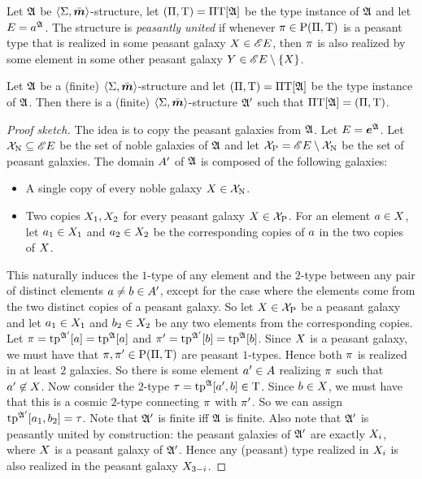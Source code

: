 \begin{definition}
Let $\mathfrak{A}$ be $\left\langle \mathrm{\Sigma},\bar{\bm{m}} \right\rangle$-structure, let $(\Pi,\mathrm{T}) =
\Pi\mathrm{T}[\mathfrak{A}]$ be the type instance of $\mathfrak{A}$ and let $E =
a^{\mathfrak{A}}$. The structure is \emph{peasantly united} if whenever $\pi \in
\mathrm{P}(\Pi,\mathrm{T})$ is a peasant type that is realized in some peasant galaxy
$X \in {\mathscr{E}E}$, then $\pi$ is also realized by some element in some
other peasant galaxy $Y \in {\mathscr{E}E} \setminus \left\{X\right\}$.
\end{definition}
\begin{lemma}
Let $\mathfrak{A}$ be a (finite) $\left\langle \mathrm{\Sigma},\bar{\bm{m}} \right\rangle$-structure and let $(\Pi,\mathrm{T}) =
\Pi\mathrm{T}[\mathfrak{A}]$ be the type instance of $\mathfrak{A}$.
Then there is a (finite) $\left\langle \mathrm{\Sigma},\bar{\bm{m}} \right\rangle$-structure $\mathfrak{A'}$ such that
$\Pi\mathrm{T}[\mathfrak{A}] = (\Pi,\mathrm{T})$.
\end{lemma}
\begin{proof}[Proof sketch]
The idea is to copy the peasant galaxies from $\mathfrak{A}$. Let $E =
\bm{e}^{\mathfrak{A}}$. Let $\mathcal{X}_{\mathrm{\mathrm{N}}} \subseteq {\mathscr{E}E}$ be the set of noble
galaxies of $\mathfrak{A}$ and let $\mathcal{X}_{\mathrm{P}} = {\mathscr{E}E} \setminus \mathcal{X}_{\mathrm{\mathrm{N}}}$
be the set of peasant galaxies. The domain $A'$ of $\mathfrak{A}$ is composed of
the following galaxies:
\begin{itemize}
  \item A single copy of every noble galaxy $X \in \mathcal{X}_{\mathrm{\mathrm{N}}}$.
  \item Two copies $X_1, X_2$ for every peasant galaxy $X \in
  \mathcal{X}_{\mathrm{P}}$. For an element $a \in X$, let $a_1 \in X_1$ and
  $a_2 \in X_2$ be the corresponding copies of $a$ in the two copies of
  $X$.
\end{itemize}
This naturally induces the $1$-type of any element and the $2$-type between any
pair of distinct elements $a \neq b \in A'$, except for the case where
the elements come from the two distinct copies of a peasant galaxy. So let
$X \in \mathcal{X}_{\mathrm{P}}$ be a peasant galaxy and let
$a_1 \in X_1$ and $b_2 \in X_2$ be any two elements from the
corresponding copies. Let $\pi = \operatorname{tp}^{\mathfrak{A'}}[a] = \operatorname{tp}^{\mathfrak{A}}[a]$ and
${\pi'} = \operatorname{tp}^{\mathfrak{A'}}[b] = \operatorname{tp}^{\mathfrak{A}}[b]$. Since $X$ is a peasant galaxy,
we must have that $\pi, {\pi'} \in \mathrm{P}(\Pi,\mathrm{T})$ are peasant $1$-types.
Hence both $\pi$ is realized in at least $2$ galaxies.
So there is some element ${a'} \in A$ realizing $\pi$ 
such that ${a'} \not\in X$. Now consider the $2$-type $\tau =
\operatorname{tp}^{\mathfrak{A}}[{a'},b] \in \mathrm{T}$.
Since $b \in X$, we must have that this is a cosmic $2$-type connecting
$\pi$ with ${\pi'}$. So we can assign $\operatorname{tp}^{\mathfrak{A'}}[a_1,b_2] = \tau$.
Note that $\mathfrak{A'}$ is finite iff $\mathfrak{A}$ is finite.
Also note that $\mathfrak{A'}$ is peasantly united by construction: the peasant
galaxies of $\mathfrak{A'}$ are exactly $X_i$, where $X$ is a peasant galaxy of
$\mathfrak{A'}$. Hence any (peasant) type realized in $X_i$ is also realized in the
peasant galaxy $X_{3-i}$.
\end{proof}

